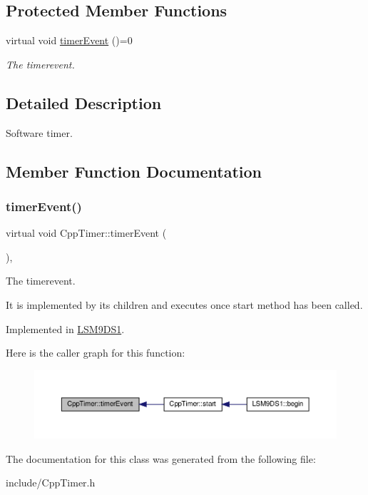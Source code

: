 \subsection*{Protected Member Functions}
\begin{DoxyCompactItemize}
\item 
virtual void \hyperlink{classCppTimer_ac2665403595b6aee5f581d0ebfeb886c}{timer\+Event} ()=0
\begin{DoxyCompactList}\small\item\em The timerevent. \end{DoxyCompactList}\end{DoxyCompactItemize}


\subsection{Detailed Description}
Software timer. 

\subsection{Member Function Documentation}
\mbox{\label{classCppTimer_ac2665403595b6aee5f581d0ebfeb886c}} 
\subsubsection{\texorpdfstring{timer\+Event()}{timerEvent()}}
{\footnotesize\ttfamily virtual void Cpp\+Timer\+::timer\+Event (\begin{DoxyParamCaption}{ }\end{DoxyParamCaption})\hspace{0.3cm}{\ttfamily [protected]}, {}}



The timerevent. 

It is implemented by its children and executes once start method has been called. 

Implemented in \hyperlink{classLSM9DS1_ad1fffc2bc5987339430d3b293da0bdd1}{L\+S\+M9\+D\+S1}.

Here is the caller graph for this function\+:\nopagebreak
\begin{figure}[H]
\begin{center}
\leavevmode
\includegraphics[width=350pt]{classCppTimer_ac2665403595b6aee5f581d0ebfeb886c_icgraph}
\end{center}
\end{figure}


The documentation for this class was generated from the following file\+:\begin{DoxyCompactItemize}
\item 
include/Cpp\+Timer.\+h\end{DoxyCompactItemize}
